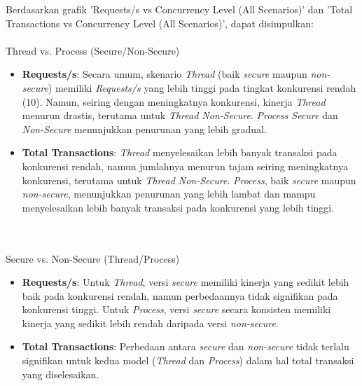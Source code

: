 \documentclass[12pt]{article}
\begin{document}
Berdasarkan grafik 'Requests/s vs Concurrency Level (All Scenarios)' dan 'Total Transactions vs Concurrency Level (All Scenarios)', dapat disimpulkan:
\\\\
Thread vs. Process (Secure/Non-Secure)
\begin{itemize}
    \item \textbf{Requests/s}: Secara umum, skenario \textit{Thread} (baik \textit{secure} maupun \textit{non-secure}) memiliki \textit{Requests/s} yang lebih tinggi pada tingkat konkurensi rendah (10). Namun, seiring dengan meningkatnya konkurensi, kinerja \textit{Thread} menurun drastis, terutama untuk \textit{Thread Non-Secure}. \textit{Process Secure} dan \textit{Non-Secure} menunjukkan penurunan yang lebih gradual.
    \item \textbf{Total Transactions}: \textit{Thread} menyelesaikan lebih banyak transaksi pada konkurensi rendah, namun jumlahnya menurun tajam seiring meningkatnya konkurensi, terutama untuk \textit{Thread Non-Secure}. \textit{Process}, baik \textit{secure} maupun \textit{non-secure}, menunjukkan penurunan yang lebih lambat dan mampu menyelesaikan lebih banyak transaksi pada konkurensi yang lebih tinggi.
\end{itemize}
\\\\
Secure vs. Non-Secure (Thread/Process)
\begin{itemize}
    \item \textbf{Requests/s}: Untuk \textit{Thread}, versi \textit{secure} memiliki kinerja yang sedikit lebih baik pada konkurensi rendah, namun perbedaannya tidak signifikan pada konkurensi tinggi. Untuk \textit{Process}, versi \textit{secure} secara konsisten memiliki kinerja yang sedikit lebih rendah daripada versi \textit{non-secure}.
    \item \textbf{Total Transactions}: Perbedaan antara \textit{secure} dan \textit{non-secure} tidak terlalu signifikan untuk kedua model (\textit{Thread} dan \textit{Process}) dalam hal total transaksi yang diselesaikan.
\end{itemize}

\newpage
\end{document}
